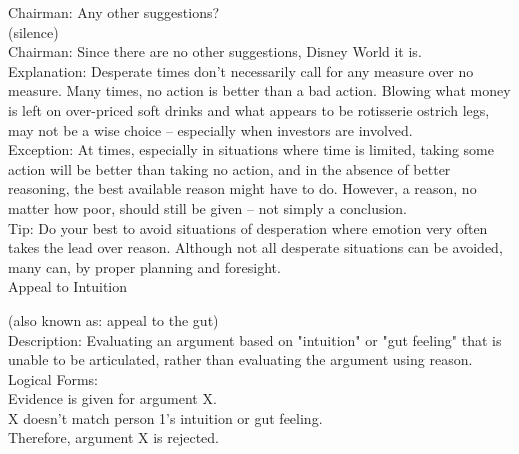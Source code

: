 \documentclass[a4paper,12pt,single,pdftex]{scrartcl}
\begin{document}
    
      Chairman: Any other suggestions?
    \\

    
      (silence)
    \\

    
      Chairman: Since there are no other suggestions, Disney World it is.
    \\

    
      Explanation: Desperate times don’t necessarily call for any measure over no measure.  Many times, no action is better than a bad action.  Blowing what money is left on over-priced soft drinks and what appears to be rotisserie ostrich legs, may not be a wise choice -- especially when investors are involved.
    \\

    
      Exception: At times, especially in situations where time is limited, taking some action will be better than taking no action, and in the absence of better reasoning, the best available reason might have to do.  However, a reason, no matter how poor, should still be given -- not simply a conclusion.
    \\

    
      Tip: Do your best to avoid situations of desperation where emotion very often takes the lead over reason.  Although not all desperate situations can be avoided, many can, by proper planning and foresight.
    \\

  

Appeal to Intuition
    
      (also known as: appeal to the gut)
    \\

  
    
      Description: Evaluating an argument based on "intuition" or "gut feeling" that is unable to be articulated, rather than evaluating the argument using reason.
    \\

    
      Logical Forms:
    \\

    
      Evidence is given for argument X.
    \\

    
      X doesn't match person 1's intuition or gut feeling.
    \\

    
      Therefore, argument X is rejected.
    \\

    
       
\end{document}
